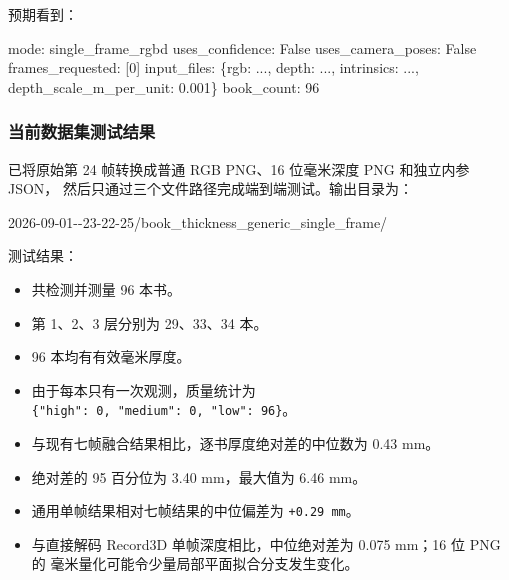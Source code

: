 \documentclass[
  chinese,
  11pt,
  a4paper,
]{article}
\newenvironment{Shaded}{\begin{snugshade}}{\end{snugshade}}
\newcommand{\NormalTok}[1]{#1}
\providecommand{\tightlist}{%
  \setlength{\itemsep}{0pt}\setlength{\parskip}{0pt}}
\begin{document}
预期看到：

\begin{Shaded}
\begin{Highlighting}[]
\NormalTok{mode: single\_frame\_rgbd}
\NormalTok{uses\_confidence: False}
\NormalTok{uses\_camera\_poses: False}
\NormalTok{frames\_requested: [0]}
\NormalTok{input\_files: \{\textquotesingle{}rgb\textquotesingle{}: \textquotesingle{}...\textquotesingle{}, \textquotesingle{}depth\textquotesingle{}: \textquotesingle{}...\textquotesingle{}, \textquotesingle{}intrinsics\textquotesingle{}: \textquotesingle{}...\textquotesingle{}, \textquotesingle{}depth\_scale\_m\_per\_unit\textquotesingle{}: 0.001\}}
\NormalTok{book\_count: 96}
\end{Highlighting}
\end{Shaded}

\subsubsection{当前数据集测试结果}\label{ux5f53ux524dux6570ux636eux96c6ux6d4bux8bd5ux7ed3ux679c}

已将原始第 24 帧转换成普通 RGB PNG、16 位毫米深度 PNG 和独立内参 JSON，
然后只通过三个文件路径完成端到端测试。输出目录为：

\begin{Shaded}
\begin{Highlighting}[]
\NormalTok{2026{-}09{-}01{-}{-}23{-}22{-}25/book\_thickness\_generic\_single\_frame/}
\end{Highlighting}
\end{Shaded}

测试结果：

\begin{itemize}
\tightlist
\item
  共检测并测量 96 本书。
\item
  第 1、2、3 层分别为 29、33、34 本。
\item
  96 本均有有效毫米厚度。
\item
  由于每本只有一次观测，质量统计为
  \texttt{\{"high":\ 0,\ "medium":\ 0,\ "low":\ 96\}}。
\item
  与现有七帧融合结果相比，逐书厚度绝对差的中位数为 0.43 mm。
\item
  绝对差的 95 百分位为 3.40 mm，最大值为 6.46 mm。
\item
  通用单帧结果相对七帧结果的中位偏差为 \texttt{+0.29\ mm}。
\item
  与直接解码 Record3D 单帧深度相比，中位绝对差为 0.075 mm；16 位 PNG 的
  毫米量化可能令少量局部平面拟合分支发生变化。
\end{itemize}
\end{document}
